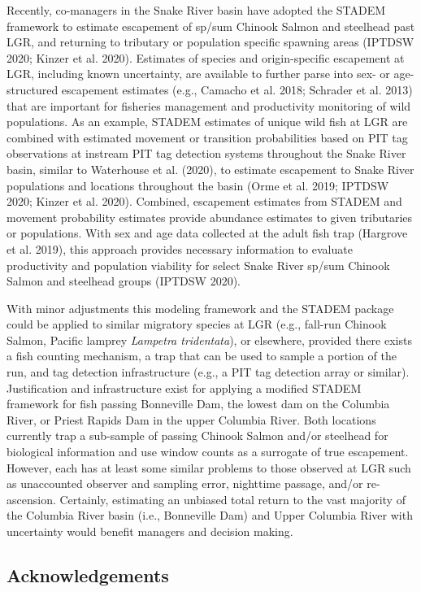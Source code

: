 \documentclass[
  12pt,
]{article}
\begin{document}
Recently, co-managers in the Snake River basin have adopted the STADEM framework to estimate escapement of sp/sum Chinook Salmon and steelhead past LGR, and returning to tributary or population specific spawning areas (IPTDSW 2020; Kinzer et al. 2020). Estimates of species and origin-specific escapement at LGR, including known uncertainty, are available to further parse into sex- or age-structured escapement estimates (e.g., Camacho et al. 2018; Schrader et al. 2013) that are important for fisheries management and productivity monitoring of wild populations. As an example, STADEM estimates of unique wild fish at LGR are combined with estimated movement or transition probabilities based on PIT tag observations at instream PIT tag detection systems throughout the Snake River basin, similar to Waterhouse et al. (2020), to estimate escapement to Snake River populations and locations throughout the basin (Orme et al. 2019; IPTDSW 2020; Kinzer et al. 2020). Combined, escapement estimates from STADEM and movement probability estimates provide abundance estimates to given tributaries or populations. With sex and age data collected at the adult fish trap (Hargrove et al. 2019), this approach provides necessary information to evaluate productivity and population viability for select Snake River sp/sum Chinook Salmon and steelhead groups (IPTDSW 2020).

With minor adjustments this modeling framework and the STADEM package could be applied to similar migratory species at LGR (e.g., fall-run Chinook Salmon, Pacific lamprey \emph{Lampetra tridentata}), or elsewhere, provided there exists a fish counting mechanism, a trap that can be used to sample a portion of the run, and tag detection infrastructure (e.g., a PIT tag detection array or similar). Justification and infrastructure exist for applying a modified STADEM framework for fish passing Bonneville Dam, the lowest dam on the Columbia River, or Priest Rapids Dam in the upper Columbia River. Both locations currently trap a sub-sample of passing Chinook Salmon and/or steelhead for biological information and use window counts as a surrogate of true escapement. However, each has at least some similar problems to those observed at LGR such as unaccounted observer and sampling error, nighttime passage, and/or re-ascension. Certainly, estimating an unbiased total return to the vast majority of the Columbia River basin (i.e., Bonneville Dam) and Upper Columbia River with uncertainty would benefit managers and decision making.

\hypertarget{acknowledgements}{%
\subsection{Acknowledgements}\label{acknowledgements}}
\end{document}
